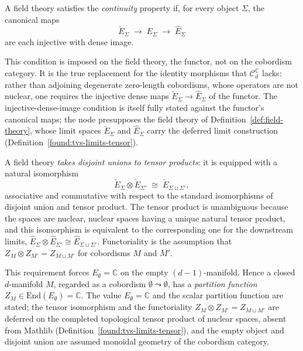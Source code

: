 \begin{definition}
  \label{def:continuity}
  \leanok
  A field theory satisfies the \emph{continuity} property if, for every object
  $\Sigma$, the canonical maps
  \[
    \check E_{\Sigma} \;\longrightarrow\; E_{\Sigma} \;\longrightarrow\;
    \hat E_{\Sigma}
  \]
  are each injective with dense image.

  This condition is imposed on the field theory, the functor, not on the
  cobordism category. It is the true replacement for the identity morphisms that
  $\mathcal C_d^{\mathbb C}$ lacks: rather than adjoining degenerate zero-length
  cobordisms, whose operators are not nuclear, one requires the injective dense
  maps $\check E_{\Sigma} \to \hat E_{\Sigma}$ of the functor. The
  injective-dense-image condition is itself fully stated against the functor's
  canonical maps; the node presupposes the field theory of
  Definition~\ref{def:field-theory}, whose limit spaces $\check E_\Sigma$ and
  $\hat E_\Sigma$ carry the deferred limit construction
  (Definition~\ref{found:tvs-limits-tensor}).
\end{definition}

\begin{definition}
  \label{def:tensor-axiom}
  \notready
  A field theory \emph{takes disjoint unions to tensor products}: it is equipped
  with a natural isomorphism
  \[
    \check E_{\Sigma} \otimes \check E_{\Sigma'} \;\cong\;
    \check E_{\Sigma \sqcup \Sigma'},
  \]
  associative and commutative with respect to the standard isomorphisms of
  disjoint union and tensor product. The tensor product is unambiguous because
  the spaces are nuclear, nuclear spaces having a unique natural tensor product,
  and this isomorphism is equivalent to the corresponding one for the downstream
  limits, $\hat E_{\Sigma} \otimes \hat E_{\Sigma'} \cong
  \hat E_{\Sigma \sqcup \Sigma'}$. Functoriality is the assumption that
  $Z_M \otimes Z_{M'} = Z_{M \sqcup M'}$ for cobordisms $M$ and $M'$.

  This requirement forces $E_{\emptyset} = \mathbb C$ on the empty
  $(d-1)$-manifold. Hence a closed $d$-manifold $M$, regarded as a cobordism
  $\emptyset \leadsto \emptyset$, has a \emph{partition function}
  $Z_M \in \mathrm{End}(E_{\emptyset}) = \mathbb C$. The value
  $E_\emptyset = \mathbb C$ and the scalar partition function are stated; the
  tensor isomorphism and the functoriality
  $Z_M \otimes Z_{M'} = Z_{M \sqcup M'}$ are deferred on the completed
  topological tensor product of nuclear spaces, absent from Mathlib
  (Definition~\ref{found:tvs-limits-tensor}), and the empty object and disjoint
  union are assumed monoidal geometry of the cobordism category.
\end{definition}

